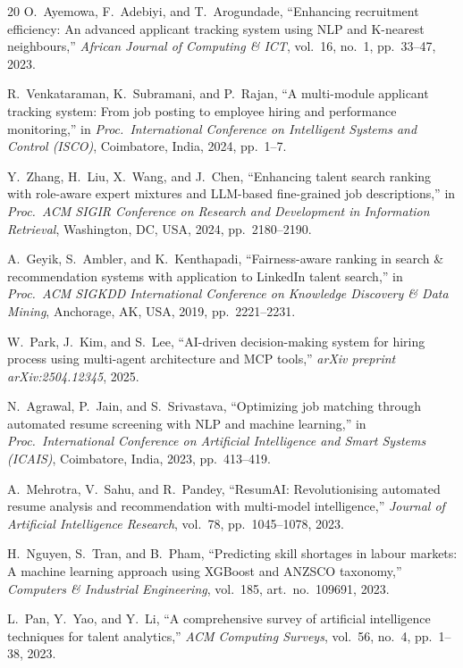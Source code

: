 \documentclass[12pt,a4paper]{report}
\begin{document}
\begin{thebibliography}{20}
O.~Ayemowa, F.~Adebiyi, and T.~Arogundade,
``Enhancing recruitment efficiency: An advanced applicant tracking system using NLP and K-nearest neighbours,''
\textit{African Journal of Computing \& ICT}, vol.~16, no.~1, pp.~33--47, 2023.

R.~Venkataraman, K.~Subramani, and P.~Rajan,
``A multi-module applicant tracking system: From job posting to employee hiring and performance monitoring,''
in \textit{Proc.\ International Conference on Intelligent Systems and Control (ISCO)}, Coimbatore, India, 2024, pp.~1--7.

Y.~Zhang, H.~Liu, X.~Wang, and J.~Chen,
``Enhancing talent search ranking with role-aware expert mixtures and LLM-based fine-grained job descriptions,''
in \textit{Proc.\ ACM SIGIR Conference on Research and Development in Information Retrieval}, Washington, DC, USA, 2024, pp.~2180--2190.

A.~Geyik, S.~Ambler, and K.~Kenthapadi,
``Fairness-aware ranking in search \& recommendation systems with application to LinkedIn talent search,''
in \textit{Proc.\ ACM SIGKDD International Conference on Knowledge Discovery \& Data Mining}, Anchorage, AK, USA, 2019, pp.~2221--2231.

W.~Park, J.~Kim, and S.~Lee,
``AI-driven decision-making system for hiring process using multi-agent architecture and MCP tools,''
\textit{arXiv preprint arXiv:2504.12345}, 2025.

N.~Agrawal, P.~Jain, and S.~Srivastava,
``Optimizing job matching through automated resume screening with NLP and machine learning,''
in \textit{Proc.\ International Conference on Artificial Intelligence and Smart Systems (ICAIS)}, Coimbatore, India, 2023, pp.~413--419.

A.~Mehrotra, V.~Sahu, and R.~Pandey,
``ResumAI: Revolutionising automated resume analysis and recommendation with multi-model intelligence,''
\textit{Journal of Artificial Intelligence Research}, vol.~78, pp.~1045--1078, 2023.

H.~Nguyen, S.~Tran, and B.~Pham,
``Predicting skill shortages in labour markets: A machine learning approach using XGBoost and ANZSCO taxonomy,''
\textit{Computers \& Industrial Engineering}, vol.~185, art.\ no.\ 109691, 2023.

L.~Pan, Y.~Yao, and Y.~Li,
``A comprehensive survey of artificial intelligence techniques for talent analytics,''
\textit{ACM Computing Surveys}, vol.~56, no.~4, pp.~1--38, 2023.


\end{thebibliography}
\end{document}
